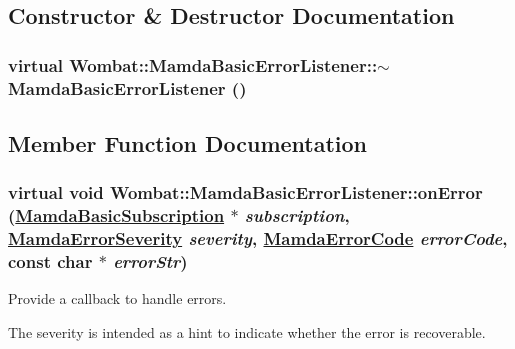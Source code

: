 \subsection{Constructor \& Destructor Documentation}
\hypertarget{classWombat_1_1MamdaBasicErrorListener_0c541cf730dc127a79b5b4062fce7f4a}{
\subsubsection[$\sim$MamdaBasicErrorListener]{\setlength{\rightskip}{0pt plus 5cm}virtual Wombat::Mamda\-Basic\-Error\-Listener::$\sim$Mamda\-Basic\-Error\-Listener ()}}
\label{classWombat_1_1MamdaBasicErrorListener_0c541cf730dc127a79b5b4062fce7f4a}




\subsection{Member Function Documentation}
\hypertarget{classWombat_1_1MamdaBasicErrorListener_26eda50eb507e63df180e73ed3d43014}{
\subsubsection[onError]{\setlength{\rightskip}{0pt plus 5cm}virtual void Wombat::Mamda\-Basic\-Error\-Listener::on\-Error (\hyperlink{classWombat_1_1MamdaBasicSubscription}{Mamda\-Basic\-Subscription} $\ast$ {\em subscription}, \hyperlink{namespaceWombat_10f0aa05514c69e0d8e360af40278c8c}{Mamda\-Error\-Severity} {\em severity}, \hyperlink{namespaceWombat_0bef5aac9df8b606704a54a376f45597}{Mamda\-Error\-Code} {\em error\-Code}, const char $\ast$ {\em error\-Str})}}
\label{classWombat_1_1MamdaBasicErrorListener_26eda50eb507e63df180e73ed3d43014}


Provide a callback to handle errors. 

The severity is intended as a hint to indicate whether the error is recoverable. 
